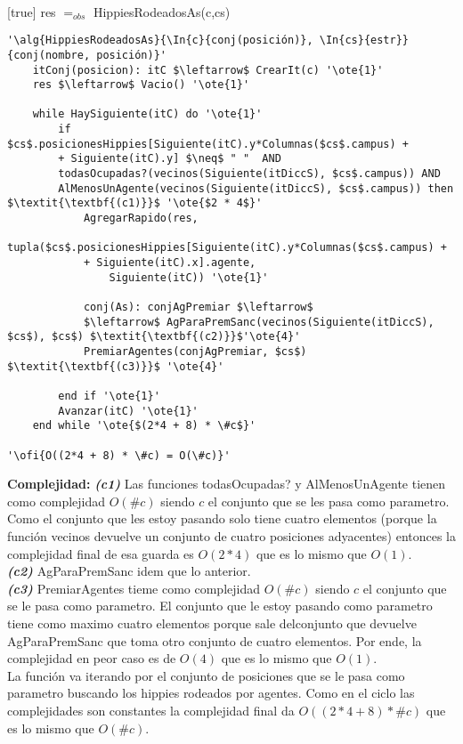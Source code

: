 ~


[true]
{res $=_{obs}$ HippiesRodeadosAs(c,cs)}

\begin{lstlisting}[mathescape]
'\alg{HippiesRodeadosAs}{\In{c}{conj(posición)}, \In{cs}{estr}}{conj(nombre, posición)}'
	itConj(posicion): itC $\leftarrow$ CrearIt(c) '\ote{1}'
	res $\leftarrow$ Vacio() '\ote{1}'

	while HaySiguiente(itC) do '\ote{1}'
		if $cs$.posicionesHippies[Siguiente(itC).y*Columnas($cs$.campus) +
		+ Siguiente(itC).y] $\neq$ " "  AND
		todasOcupadas?(vecinos(Siguiente(itDiccS), $cs$.campus)) AND
		AlMenosUnAgente(vecinos(Siguiente(itDiccS), $cs$.campus)) then $\textit{\textbf{(c1)}}$ '\ote{$2 * 4$}'
			AgregarRapido(res,
			tupla($cs$.posicionesHippies[Siguiente(itC).y*Columnas($cs$.campus) +
			+ Siguiente(itC).x].agente,
				Siguiente(itC)) '\ote{1}'

			conj(As): conjAgPremiar $\leftarrow$
			$\leftarrow$ AgParaPremSanc(vecinos(Siguiente(itDiccS), $cs$), $cs$) $\textit{\textbf{(c2)}}$'\ote{4}'
			PremiarAgentes(conjAgPremiar, $cs$) $\textit{\textbf{(c3)}}$ '\ote{4}'

		end if '\ote{1}'
		Avanzar(itC) '\ote{1}'
	end while '\ote{$(2*4 + 8) * \#c$}'

'\ofi{O((2*4 + 8) * \#c) = O(\#c)}'
\end{lstlisting}

\textbf{Complejidad:} \textit{\textbf{(c1)}} Las funciones todasOcupadas? y AlMenosUnAgente tienen como complejidad $O(\#c)$ siendo $c$ el conjunto que se les pasa como parametro. Como el conjunto que les estoy pasando solo tiene cuatro elementos (porque la función vecinos devuelve un conjunto de cuatro posiciones adyacentes) entonces la complejidad final de esa guarda es $O(2*4)$ que es lo mismo que $O(1)$. \\
\textit{\textbf{(c2)}} AgParaPremSanc idem que lo anterior. \\
\textit{\textbf{(c3)}} PremiarAgentes tieme como complejidad $O(\#c)$ siendo $c$ el conjunto que se le pasa como parametro. El conjunto que le estoy pasando como parametro tiene como maximo cuatro elementos porque sale delconjunto que devuelve AgParaPremSanc que toma otro conjunto de cuatro elementos. Por ende, la complejidad en peor caso es de $O(4)$ que es lo mismo que $O(1)$. \\
La función va iterando por el conjunto de posiciones que se le pasa como parametro buscando los hippies rodeados por agentes. Como en el ciclo las complejidades son constantes la complejidad final da $O((2*4+8)*\#c)$ que es lo mismo que $O(\#c)$.

